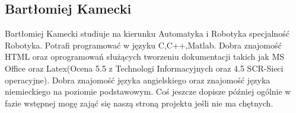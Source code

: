 \subsection{Bartłomiej Kamecki}
Bartłomiej Kamecki studiuje na kierunku Automatyka i Robotyka specjalność Robotyka. Potrafi programować w języku C,C++,Matlab. Dobra znajomość HTML oraz oprogramowań służących tworzeniu dokumentacji takich jak MS Office oraz Latex(Ocena 5.5 z Technologi Informacyjnych oraz 4.5 SCR-Sieci operacyjne). Dobra znajomość języka angielskiego oraz znajomość języka niemieckiego na poziomie podstawowym. Coś jeszcze dopisze później ogólnie w fazie wstępnej mogę zająć się naszą stroną projektu jeśli nie ma chętnych.
